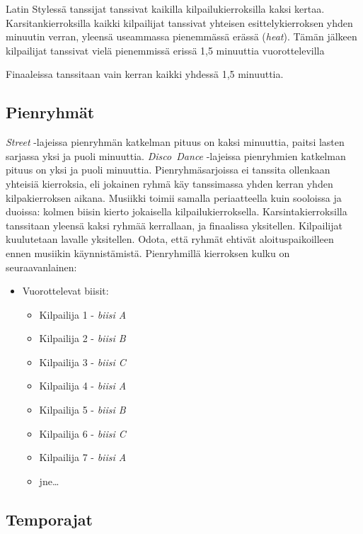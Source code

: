 \documentclass[12pt, a4paper, oneside]{article}
\begin{document}
Latin Stylessä tanssijat tanssivat kaikilla kilpailukierroksilla kaksi kertaa.
Karsitankierroksilla kaikki kilpailijat tanssivat yhteisen esittelykierroksen yhden minuutin verran,
yleensä useammassa pienemmässä erässä (\textit{heat}).
Tämän jälkeen kilpailijat tanssivat vielä pienemmissä erissä 1,5 minuuttia vuorottelevilla

Finaaleissa tanssitaan vain kerran kaikki yhdessä 1,5 minuuttia.

\subsection{Pienryhmät} \label{subsec:pienryhmat}

\textit{Street} -lajeissa pienryhmän katkelman pituus on kaksi minuuttia, paitsi lasten sarjassa yksi ja puoli minuuttia.
\textit{Disco~Dance} -lajeissa pienryhmien katkelman pituus on yksi ja puoli minuuttia.
Pienryhmäsarjoissa ei tanssita ollenkaan yhteisiä kierroksia,
eli jokainen ryhmä käy tanssimassa yhden kerran yhden kilpakierroksen aikana.
Musiikki toimii samalla periaatteella kuin sooloissa ja duoissa:
kolmen biisin kierto jokaisella kilpailukierroksella.
Karsintakierroksilla tanssitaan yleensä kaksi ryhmää kerrallaan,
ja finaalissa yksitellen.
Kilpailijat kuulutetaan lavalle yksitellen.
Odota, että ryhmät ehtivät aloituspaikoilleen ennen musiikin käynnistämistä.
Pienryhmillä kierroksen kulku on seuraavanlainen:

\begin{itemize}[nosep]
    \item Vuorottelevat biisit:
        \begin{itemize}
            \item Kilpailija 1 - \textit{biisi A}
            \item Kilpailija 2 - \textit{biisi B}
            \item Kilpailija 3 - \textit{biisi C}
            \item Kilpailija 4 - \textit{biisi A}
            \item Kilpailija 5 - \textit{biisi B}
            \item Kilpailija 6 - \textit{biisi C}
            \item Kilpailija 7 - \textit{biisi A}
            \item jne\ldots
        \end{itemize}
\end{itemize}

\subsection{Temporajat} \label{subsec:temporajat}
\end{document}
